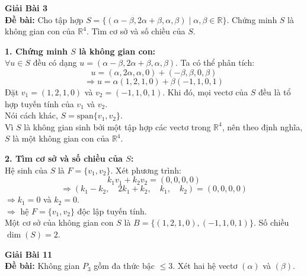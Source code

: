 \documentclass[12pt,a4paper]{article}
\begin{document}
\vspace{0.8cm}

\textbf{Giải Bài 3}\\
\textbf{Đề bài:} Cho tập hợp $S = \{(\alpha - \beta, 2\alpha + \beta, \alpha, \beta) \mid \alpha, \beta \in \mathbb{R}\}$. Chứng minh $S$ là không gian con của $\mathbb{R}^4$. Tìm cơ sở và số chiều của $S$.

\textbf{1. Chứng minh $S$ là không gian con:}\\
$\forall u \in S$ đều có dạng $u = (\alpha - \beta, 2\alpha + \beta, \alpha, \beta)$. Ta có thể phân tích:
$$u = (\alpha, 2\alpha, \alpha, 0) + (-\beta, \beta, 0, \beta)$$
$$ \Rightarrow u = \alpha(1, 2, 1, 0) + \beta(-1, 1, 0, 1)$$
Đặt $v_1 = (1, 2, 1, 0)$ và $v_2 = (-1, 1, 0, 1)$. Khi đó, mọi vectơ của $S$ đều là tổ hợp tuyến tính của $v_1$ và $v_2$.\\
Nói cách khác, $S = \text{span}\{v_1, v_2\}$.\\
Vì $S$ là không gian sinh bởi một tập hợp các vectơ trong $\mathbb{R}^4$, nên theo định nghĩa, $S$ là một không gian con của $\mathbb{R}^4$.

\textbf{2. Tìm cơ sở và số chiều của $S$:}\\
Hệ sinh của $S$ là $F = \{v_1, v_2\}$. Xét phương trình:
$$k_1 v_1 + k_2 v_2 = (0,0,0,0)$$
$$\Rightarrow (k_1 - k_2, \quad 2k_1 + k_2, \quad k_1, \quad k_2) = (0,0,0,0)$$
$\Rightarrow k_1 = 0$ và $k_2 = 0$.\\
$\Rightarrow$ hệ $F = \{v_1, v_2\}$ độc lập tuyến tính.\\
Một cơ sở của không gian con $S$ là $B = \{(1, 2, 1, 0), (-1, 1, 0, 1)\}$. Số chiều $\dim(S) = 2$.

\vspace{0.8cm}

\textbf{Giải Bài 11}\\
\textbf{Đề bài:} Không gian $P_3$ gồm đa thức bậc $\le 3$. Xét hai hệ vectơ $(\alpha)$ và $(\beta)$.
\end{document}
